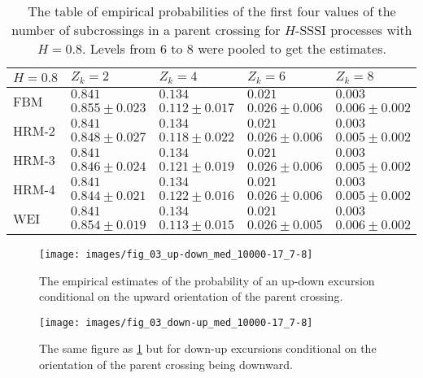 \begin{table}[h]\begin{center}
	\begin{tabular}{l||l|l|l|l|}
					$H=0.8$ & $Z_k = 2$ & $Z_k = 4$ & $Z_k = 6$ & $Z_k = 8$ \\ \hline\hline
	\multirow{2}{*}{FBM} 	& $0.841$ & $0.134$ & $0.021$ & $0.003$ \\ \cline{2-5}
 							& $0.855\pm0.023$ & $0.112\pm0.017$ & $0.026\pm0.006$ & $0.006\pm0.002$ \\ \hline\hline
	\multirow{2}{*}{HRM-2} 	& $0.841$ & $0.134$ & $0.021$ & $0.003$ \\ \cline{2-5}
 							& $0.848\pm0.027$ & $0.118\pm0.022$ & $0.026\pm0.006$ & $0.005\pm0.002$ \\ \hline\hline
	\multirow{2}{*}{HRM-3} 	& $0.841$ & $0.134$ & $0.021$ & $0.003$ \\ \cline{2-5}
 							& $0.846\pm0.024$ & $0.121\pm0.019$ & $0.026\pm0.006$ & $0.005\pm0.002$ \\ \hline\hline
	\multirow{2}{*}{HRM-4} 	& $0.841$ & $0.134$ & $0.021$ & $0.003$ \\ \cline{2-5}
 							& $0.844\pm0.021$ & $0.122\pm0.016$ & $0.026\pm0.006$ & $0.005\pm0.002$ \\ \hline\hline
	\multirow{2}{*}{WEI} 	& $0.841$ & $0.134$ & $0.021$ & $0.003$ \\ \cline{2-5}
 							& $0.854\pm0.019$ & $0.113\pm0.015$ & $0.026\pm0.005$ & $0.006\pm0.002$ \\ \hline\hline
	\end{tabular}
	\caption{The table of empirical probabilities of the first four values of the number
	of subcrossings in a parent crossing for $H$-SSSI processes with $H=0.8$. Levels from
	6 to 8 were pooled to get the estimates.}
\label{tbl:empirical_probs_02}
\end{center}\end{table}

\begin{figure}[htb]\begin{center}
    \texttt{[image: images/fig\_03\_up-down\_med\_10000-17\_7-8]}
    \caption{The empirical estimates of the probability of an up-down excursion conditional on
    the upward orientation of the parent crossing.}
\label{fig:all_offspring_up_down}
\end{center}\end{figure}

\begin{figure}[htb]\begin{center}
    \texttt{[image: images/fig\_03\_down-up\_med\_10000-17\_7-8]}
    \caption{The same figure as \ref{fig:all_offspring_up_down} but for down-up excursions
    conditional on the orientation of the parent crossing being downward.}
\label{fig:all_offspring_down_up}
\end{center}\end{figure}


